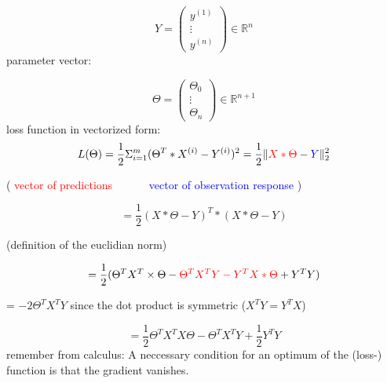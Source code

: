\[ Y =\left( \begin{array}{ccc}
y^{(1)} \\
\vdots \\
y^{(n)} \end{array} \right) \in \mathbb{R}^n\]
parameter vector:

\[ \Theta =\left( \begin{array}{ccc}
\Theta_0 \\
\vdots \\
\Theta_n \end{array} \right) \in \mathbb{R}^{n+1}\]
loss function in vectorized form:
\[L(\Theta) = \frac{1}{2} \Sigma^m_{i=1} (\Theta^T * X^{(i)} - Y^{(i)})^2 = \frac{1}{2} \lVert \textcolor{red}{X * \Theta} - \textcolor{blue}{Y} \lVert^2_2\]

\begin{center}
( \textcolor{red}{vector of predictions}$\quad\quad\quad$ \textcolor{blue}{vector of observation response} )
\end{center}
\[ = \frac{1}{2} (X * \Theta -Y)^T * (X * \Theta - Y)\]
\begin{center}
(definition of the euclidian norm)
\end{center}
\[ = \frac{1}{2} (\Theta^T X^T \times \Theta - \textcolor{red}{\Theta^T X^T Y - Y^T X*\Theta} + Y^T Y)\]
\begin{center}
= $-2 \Theta^T X^T Y$ since the dot product is symmetric ($X^T Y = Y^T X$)
\end{center}
\[= \frac{1}{2} \Theta^T X^T X \Theta - \Theta^T X^T Y + \frac{1}{2} Y^T Y\]
remember from calculus: A neccessary condition for an optimum of the (loss-) function is that the gradient vanishes.\\

